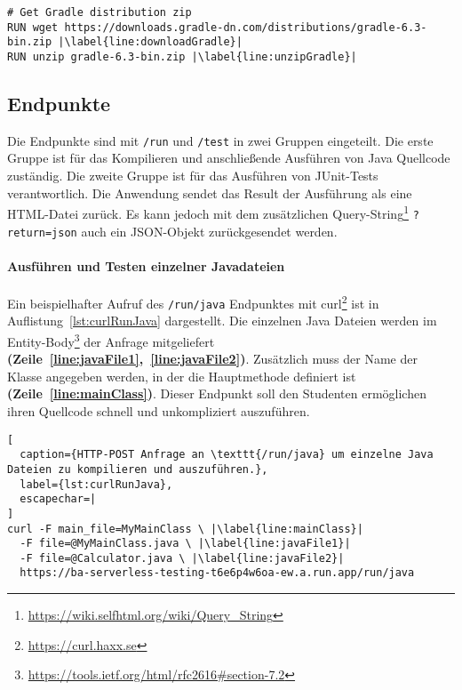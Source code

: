 \begin{lstlisting}[caption={Ausschnitt aus der Dockerfile. Herunterladen und Entpacken von Gradle.}, label={lst:gradle}, escapechar=|]
# Get Gradle distribution zip
RUN wget https://downloads.gradle-dn.com/distributions/gradle-6.3-bin.zip |\label{line:downloadGradle}|
RUN unzip gradle-6.3-bin.zip |\label{line:unzipGradle}|
\end{lstlisting}

\subsection{Endpunkte}
Die Endpunkte sind mit \texttt{/run} und
\texttt{/test} in zwei Gruppen eingeteilt.
Die erste Gruppe ist für das Kompilieren und anschließende
Ausführen von Java Quellcode zuständig. Die zweite Gruppe ist
für das Ausführen von JUnit-Tests verantwortlich. Die Anwendung
sendet das Result der Ausführung als eine HTML-Datei zurück. Es kann
jedoch mit dem zusätzlichen Query-String\footnote{\url{https://wiki.selfhtml.org/wiki/Query_String}}
\texttt{?return=json} auch ein JSON-Objekt zurückgesendet werden.

\paragraph{Ausführen und Testen einzelner Javadateien} Ein beispielhafter Aufruf des
\texttt{/run/java} Endpunktes mit curl\footnote{\url{https://curl.haxx.se}} ist in
Auflistung~\ref{lst:curlRunJava} dargestellt.
Die einzelnen Java Dateien werden im
Entity-Body\footnote{\url{https://tools.ietf.org/html/rfc2616\#section-7.2}}
der Anfrage mitgeliefert
\textbf{(Zeile~\ref{line:javaFile1},~\ref{line:javaFile2})}.
Zusätzlich muss der Name der Klasse
angegeben werden, in der die Hauptmethode definiert ist
\textbf{(Zeile~\ref{line:mainClass})}.
Dieser Endpunkt soll den Studenten ermöglichen ihren Quellcode
schnell und unkompliziert auszuführen.\\

\begin{lstlisting}[
  caption={HTTP-POST Anfrage an \texttt{/run/java} um einzelne Java Dateien zu kompilieren und auszuführen.},
  label={lst:curlRunJava},
  escapechar=|
]
curl -F main_file=MyMainClass \ |\label{line:mainClass}|
  -F file=@MyMainClass.java \ |\label{line:javaFile1}|
  -F file=@Calculator.java \ |\label{line:javaFile2}|
  https://ba-serverless-testing-t6e6p4w6oa-ew.a.run.app/run/java
\end{lstlisting}

